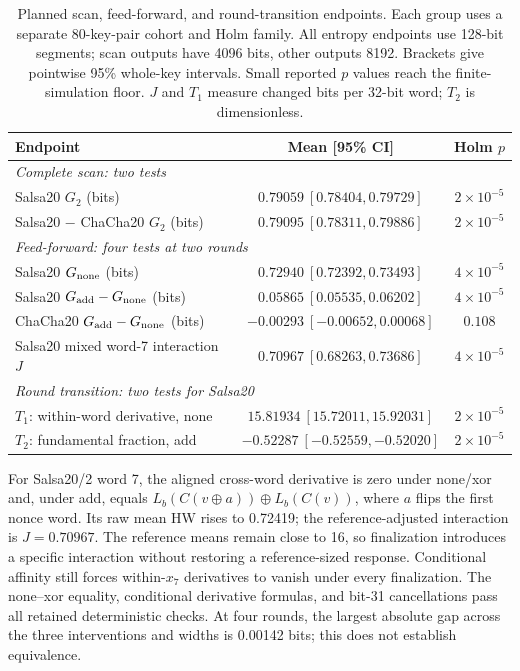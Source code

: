 \documentclass[electronics,article,submit,pdftex,oneauthor]{Definitions/mdpi}
\begin{document}
\begin{table}[t]
\caption{Planned scan, feed-forward, and round-transition endpoints. Each group uses a separate 80-key-pair cohort and Holm family. All entropy endpoints use 128-bit segments; scan outputs have 4096 bits, other outputs 8192. Brackets give pointwise 95\% whole-key intervals. Small reported $p$ values reach the finite-simulation floor. $J$ and $T_1$ measure changed bits per 32-bit word; $T_2$ is dimensionless.\label{tab:primary}}
\small\setlength{\tabcolsep}{3pt}
\begin{tabularx}{\textwidth}{Xcc}
\toprule
\textbf{Endpoint} & \textbf{Mean [95\% CI]} & \textbf{Holm $p$}\\
\midrule
\multicolumn{3}{l}{\emph{Complete scan: two tests}}\\
Salsa20 $G_2$ (bits) & $0.79059\ [0.78404,0.79729]$ & $2\times10^{-5}$\\
Salsa20 $-$ ChaCha20 $G_2$ (bits) & $0.79095\ [0.78311,0.79886]$ & $2\times10^{-5}$\\
\midrule
\multicolumn{3}{l}{\emph{Feed-forward: four tests at two rounds}}\\
Salsa20 $G_{\rm none}$ (bits) & $0.72940\ [0.72392,0.73493]$ & $4\times10^{-5}$\\
Salsa20 $G_{\rm add}-G_{\rm none}$ (bits) & $0.05865\ [0.05535,0.06202]$ & $4\times10^{-5}$\\
ChaCha20 $G_{\rm add}-G_{\rm none}$ (bits) & $-0.00293\ [-0.00652,0.00068]$ & $0.108$\\
Salsa20 mixed word-7 interaction $J$ & $0.70967\ [0.68263,0.73686]$ & $4\times10^{-5}$\\
\midrule
\multicolumn{3}{l}{\emph{Round transition: two tests for Salsa20}}\\
$T_1$: within-word derivative, none & $15.81934\ [15.72011,15.92031]$ & $2\times10^{-5}$\\
$T_2$: fundamental fraction, add & $-0.52287\ [-0.52559,-0.52020]$ & $2\times10^{-5}$\\
\bottomrule
\end{tabularx}
\end{table}

For Salsa20/2 word 7, the aligned cross-word derivative is zero under none/xor and, under add, equals $L_b(C(v\oplus a))\oplus L_b(C(v))$, where $a$ flips the first nonce word. Its raw mean HW rises to 0.72419; the reference-adjusted interaction is $J=0.70967$. The reference means remain close to 16, so finalization introduces a specific interaction without restoring a reference-sized response. Conditional affinity still forces within-$x_7$ derivatives to vanish under every finalization. The none--xor equality, conditional derivative formulas, and bit-31 cancellations pass all retained deterministic checks. At four rounds, the largest absolute gap across the three interventions and widths is 0.00142 bits; this does not establish equivalence.
\end{document}
